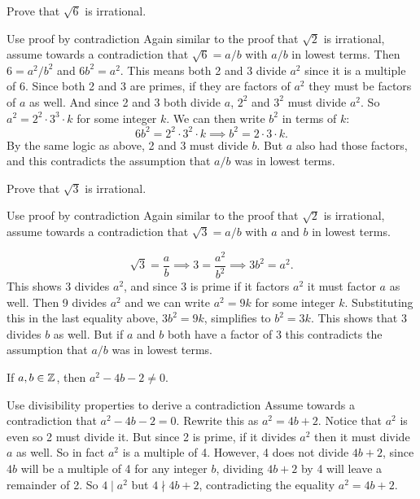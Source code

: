 \documentclass{article}
\begin{document}
\begin{problem}
Prove that $\sqrt{6}$ is irrational.
\end{problem}
\begin{solution}{Use proof by contradiction}
  Again similar to the proof that $\sqrt{2}$ is irrational, assume towards a contradiction that $\sqrt{6} = a/b$ with $a/b$ in lowest terms. Then $6 = a^2/b^2$ and $6b^2 = a^2$. This means both 2 and 3 divide $a^2$ since it is a multiple of 6. Since both 2 and 3 are primes, if they are factors of $a^2$ they must be factors of $a$ as well. And since 2 and 3 both divide $a$, $2^2$ and $3^2$ must divide $a^2$. So $a^2 = 2^2 \cdot 3^3 \cdot k$ for some integer $k$. We can then write $b^2$ in terms of $k$:
  $$6b^2 = 2^2 \cdot 3^2 \cdot k \implies b^2 = 2\cdot 3 \cdot k.$$
  By the same logic as above, 2 and 3 must divide $b$. But $a$ also had those factors, and this contradicts the assumption that $a/b$ was in lowest terms.
\end{solution}

\begin{problem}
Prove that $\sqrt{3}$ is irrational.
\end{problem}
\begin{solution}{Use proof by contradiction}
  Again similar to the proof that $\sqrt{2}$ is irrational, assume towards a contradiction that $\sqrt{3} = a/b$ with $a$ and $b$ in lowest terms.

  $$\sqrt{3} = \frac{a}{b} \implies 3 = \frac{a^2}{b^2} \implies 3b^2 = a^2.$$
  This shows 3 divides $a^2$, and since 3 is prime if it factors $a^2$ it must factor $a$ as well. Then 9 divides $a^2$ and we can write $a^2 = 9k$ for some integer $k$. Substituting this in the last equality above, $3b^2 = 9k$, simplifies to $b^2 = 3k$. This shows that 3 divides $b$ as well. But if $a$ and $b$ both have a factor of 3 this contradicts the assumption that $a/b$ was in lowest terms.

\end{solution}

\begin{problem}
If $a, b \in\mathbb{Z}$, then $a^2 - 4b - 2 \neq 0$.
\end{problem}
\begin{solution}{Use divisibility properties to derive a contradiction}
  Assume towards a contradiction that $a^2 - 4b -2 = 0$. Rewrite this as $a^2 = 4b + 2$. Notice that $a^2$ is even so 2 must divide it. But since 2 is prime, if it divides $a^2$ then it must divide $a$ as well. So in fact $a^2$ is a multiple of 4. However, 4 does not divide $4b + 2$, since $4b$ will be a multiple of 4 for any integer $b$, dividing $4b + 2$ by 4 will leave a remainder of 2. So $4 \mid a^2$ but $4 \nmid 4b + 2$, contradicting the equality $a^2 = 4b + 2$.
\end{solution}
\end{document}
